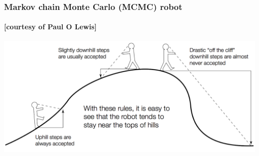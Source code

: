 \begin{frame}
\frametitle{Markov chain Monte Carlo (MCMC) robot}
\framesubtitle{[courtesy of Paul O Lewis]}

\includegraphics[width=\textwidth]{../images/mcmcRobot}

\end{frame}

